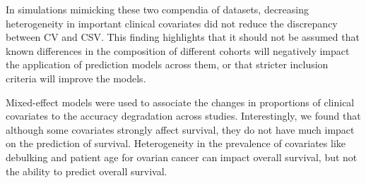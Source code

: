 \documentclass{bioinfo}
\begin{document}
In simulations mimicking these two compendia of datasets, decreasing
heterogeneity in important clinical covariates %
did not reduce the
discrepancy between CV and CSV. %
This finding highlights that it should not be assumed that known
differences in the composition of different cohorts will negatively
impact the application of prediction models across them, or that
stricter inclusion criteria will improve the models.


Mixed-effect models were used to associate the changes 
in proportions of clinical covariates to the accuracy
degradation across studies. %
Interestingly, we found that although some covariates strongly affect survival, 
they do not have much impact on the prediction of survival. Heterogeneity in the prevalence 
of covariates like debulking and patient age for ovarian cancer can impact 
overall survival, but not the ability to predict overall survival.
\end{document}
